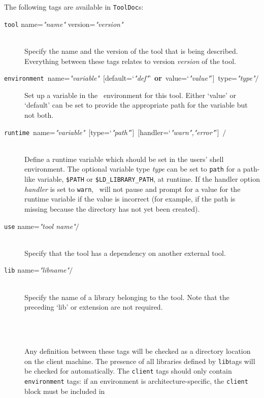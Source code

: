 \ni The following tags are available in \texttt{ToolDoc}s:
\begin{description}     
\item[\lbkt\texttt{tool} name=\textit{"name"} version=\textit{"version"}\rbkt{}]\mbox{}\\
  Specify the name and the version of the tool that is being
  described. Everything between these tags relates to version
  \textit{version} of the tool.
\item[\mbox{\lbkt\texttt{environment} name=\textit{"variable"}
    {[}default=`\textit{"def"}' \textbf{or} value=`\textit{"value"}'{]}
    type=\textit{"type"}$/$\rbkt}]
  Set up a variable in the \scram\ environment for this tool.
  Either `value' or `default' can be set
  to provide the appropriate path for the variable but not both.
\item[\mbox{\lbkt\texttt{runtime} name=\textit{"variable"}
    {[}type=`\textit{"path"}'{]}
    {[}handler=`\textit{"warn","error"}'{]} $/$\rbkt}]\mbox{}\\
  Define a runtime variable which should be set in the users' shell
  environment. The optional variable type \textit{type} can be set
  to \texttt{path} for a path-like variable, \eg
  \texttt{\$PATH} or \texttt{\$LD\_LIBRARY\_PATH}, at runtime.
  If the handler option \textit{handler} is set to \texttt{warn},
  \scram\ will not pause and prompt for a value for the runtime
  variable if the value is incorrect (for example, if the path is
  missing because the directory has not yet been created).
\item[\lbkt\texttt{use} name=\textit{"tool name"}$/$\rbkt]\mbox{}\\
  Specify that the tool has a dependency on another external tool.
\item[\lbkt\texttt{lib} name=\textit{"libname"}$/$\rbkt]\mbox{}\\
  Specify the name of a library belonging to the tool. Note that the
  preceding `lib' or extension are not required.
\item[~]\mbox{}\\
  Any  definition between these tags will be
  checked as a directory location on the client machine.
  The presence of all libraries defined by \lbkt\texttt{lib}\rbkt tags 
  will be checked for automatically. The \texttt{client} tags should
  only contain \texttt{environment} tags: if an environment is
  architecture-specific, the \texttt{client} block must be included in

\end{description}
